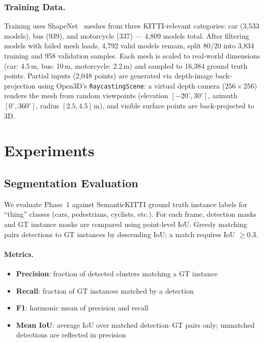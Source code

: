 \documentclass[runningheads]{llncs}
\begin{document}
\subsubsection{Training Data.}
Training uses ShapeNet~\cite{chang2015shapenetinformationrich3dmodel} meshes from three KITTI-relevant categories: car (3{,}533 models), bus (939), and motorcycle (337) --- 4{,}809 models total. After filtering models with failed mesh loads, 4{,}792 valid models remain, split 80/20 into 3{,}834 training and 958 validation samples. Each mesh is scaled to real-world dimensions (car: 4.5\,m, bus: 10\,m, motorcycle: 2.2\,m) and sampled to 16{,}384 ground truth points. Partial inputs (2{,}048 points) are generated via depth-image back-projection using Open3D's \texttt{RaycastingScene}: a virtual depth camera ($256 \times 256$) renders the mesh from random viewpoints (elevation $[-20^{\circ}, 30^{\circ}]$, azimuth $[0^{\circ}, 360^{\circ}]$, radius $[2.5, 4.5]$\,m), and visible surface points are back-projected to 3D.


\section{Experiments}

\subsection{Segmentation Evaluation}

We evaluate Phase~1 against SemanticKITTI ground truth instance labels for ``thing'' classes (cars, pedestrians, cyclists, etc.). For each frame, detection masks and GT instance masks are compared using point-level IoU. Greedy matching pairs detections to GT instances by descending IoU; a match requires IoU $\geq 0.3$.

\paragraph{Metrics.}
\begin{itemize}
    \item \textbf{Precision}: fraction of detected clusters matching a GT instance
    \item \textbf{Recall}: fraction of GT instances matched by a detection
    \item \textbf{F1}: harmonic mean of precision and recall
    \item \textbf{Mean IoU}: average IoU over matched detection--GT pairs only; unmatched detections are reflected in precision
\end{itemize}
\end{document}
